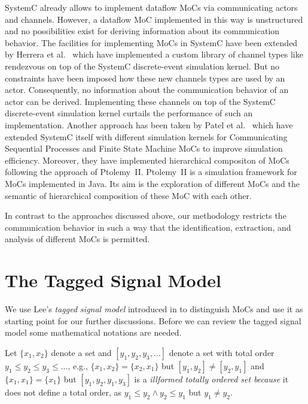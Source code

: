 SystemC \cite{glms:2002} already allows to implement
dataflow MoCs via communicating actors and  channels.
However, a dataflow MoC implemented in this way is unstructured
and no possibilities exist for deriving information about its
communication behavior. The facilities for implementing MoCs in
SystemC have been extended by Herrera et al.~\cite{herrerasystemc:2004}
which have implemented a custom library of channel types like rendezvous
on top of the SystemC discrete-event simulation kernel. But no
constraints have been imposed how these new channels types are used by
an actor. Consequently, no information about the communication behavior
of an actor can be derived.
Implementing these channels on top of the SystemC discrete-event
simulation kernel curtails the performance of such an implementation.
Another approach has been taken by Patel et al.~\cite{fermatmoc:2004}
which have extended SystemC itself with different simulation kernels
for Communicating Sequential Processes and Finite State Machine MoCs
to improve simulation efficiency. Moreover,
they have implemented hierarchical compositon of MoCs following
the approach of \hbox{Ptolemy II}. \hbox{Ptolemy II} \cite{ptolemyII} is a simulation
framework for MoCs implemented in Java. Its aim is the exploration of
different MoCs and the semantic of hierarchical composition of these MoC
with each other.

In contrast to the approaches discussed above, our methodology restricts
the communication behavior in such a way that the identification,
extraction, and analysis of different MoCs is permitted.

\section{The Tagged Signal Model}\label{lee-tsm}

We use Lee's \emph{tagged signal model} introduced in \cite{Lee98} to
distinguish MoCs and use it as starting point for our further
discussions. Before we can review the tagged signal model some mathematical
notations are needed.

Let $\{x_1,x_2\}$ denote a set and $[y_1,y_2,y_3,\ldots]$ denote a set
with total order $y_1 \le y_2 \le y_3 \le \ldots$, e.g., $\{x_1,x_2\} = \{x_2,x_1\}$ but
$[y_1,y_2] \ne [y_2,y_1]$ and $\{x_1,x_1\} = \{x_1\}$ but $[ y_1, y_2, y_1, y_3]$
is a \emph{illformed totally ordered set because} it does not define a total order,
as $y_1 \le y_2 \wedge y_2 \le y_1$ but $y_1 \ne y_2$.

